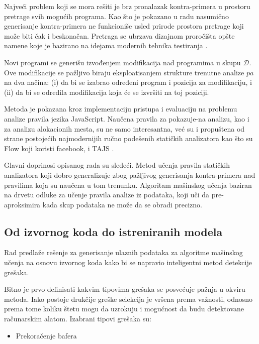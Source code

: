 \documentclass[a4paper]{article}
\theoremstyle{definition}
\begin{document}
{Najveći problem koji se mora rešiti je brz pronalazak kontra-primera u prostoru 
pretrage svih mogućih programa. Kao što je pokazano u radu \cite{staticAnalyzer} 
nasumično generisanje kontra-primera ne funkcioniše usled prirode prostora 
pretrage koji može biti čak i beskonačan. Pretraga se ubrzava dizajnom 
proročišta opšte namene koje je bazirano na idejama modernih tehnika testiranja 
\cite{testing}. 

Novi programi se generišu izvođenjem modifikacija nad programima u skupu 
$\mathcal{D}$. Ove modifikacije se pažljivo biraju eksploatisanjem strukture 
trenutne analize $pa$ na dva načina: (i) da bi se izabrao određeni program i 
pozicija za modifikaciju, i (ii) da bi se odredila modifikacija koja će se 
izvršiti na toj poziciji.


Metoda je pokazana kroz implementaciju pristupa i evaluaciju na problemu analize 
pravila jezika JavaScript. Naučena pravila za pokazuje-na analizu, kao i za 
analizu alokacionih mesta, su ne samo interesantna, već su i propuštena od 
strane postojećih najmodernijih ručno podešenih statičkih analizatora kao što 
su Flow \cite{flow} koji koristi facebook, i TAJS \cite{tajs}.

Glavni doprinosi opisanog rada su sledeći. Metod učenja pravila statičkih 
analizatora koji dobro generalizuje zbog pažljivog generisanja kontra-primera 
nad pravilima koja su naučena u tom trenunku. Algoritam mašinskog učenja baziran 
na drvetu odluke za učenje pravila analize iz podataka, koji uči da 
pre-aproksimira kada skup podataka ne može da se obradi precizno. 

\subsection{Od izvornog koda do istreniranih modela}
\label{subsec:pregled}

Rad \cite{staticFeatures} predlaže rešenje za generisanje ulaznih podataka za algoritme mašinskog učenja na osnovu
izvornog koda kako bi se napravio inteligentni metod detekcije grešaka.

Bitno je prvo definisati kakvim tipovima grešaka se posvećuje pažnja u okviru metoda.
Iako postoje drukčije greške selekcija je vršena prema važnosti, odnosno prema tome
koliku štetu mogu da uzrokuju i mogućnost da budu detektovane računarskim alatom. Izabrani tipovi grešaka su:

\begin{itemize}
\item Prekoračenje bafera


\end{itemize}}
\end{document}
